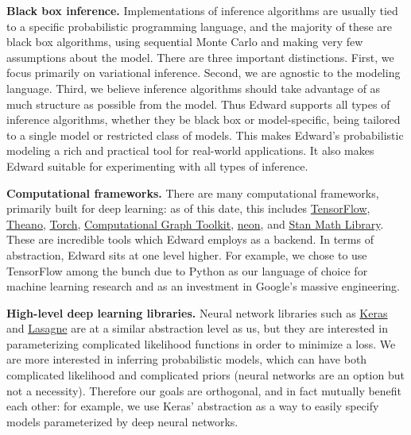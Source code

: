 \textbf{Black box inference.}
Implementations of inference algorithms are usually tied to a specific
probabilistic programming language, and the majority of these are
black box algorithms, using sequential Monte Carlo and making very few
assumptions about the model. There are three important distinctions.
First, we focus primarily on variational inference. Second, we are
agnostic to the modeling language. Third, we believe inference
algorithms should take advantage of as much structure as possible from
the model. Thus Edward supports all types of inference algorithms,
whether they be black box or model-specific, being tailored to a
single model or restricted class of models.  This makes Edward's
probabilistic modeling a rich and practical tool for real-world
applications. It also makes Edward suitable for experimenting with
all types of inference.

\textbf{Computational frameworks.}
There are many computational frameworks, primarily built for deep
learning: as of this date, this includes
\href{https://www.tensorflow.org}{TensorFlow},
\href{http://deeplearning.net/software/theano/}{Theano},
\href{http://torch.ch}{Torch},
\href{http://rll.berkeley.edu/cgt/}{Computational Graph Toolkit},
\href{https://github.com/NervanaSystems/neon}{neon}, and
\href{https://github.com/stan-dev/math}{Stan Math Library}. These are
incredible tools which Edward employs as a backend. In
terms of abstraction, Edward sits at one level higher. For example,
we chose to use TensorFlow among the bunch due to Python as our language
of choice for machine learning research and as an investment in Google's
massive engineering.

\textbf{High-level deep learning libraries.}
Neural network libraries
such as \href{https://github.com/fchollet/keras}{Keras} and
\href{https://github.com/Lasagne/Lasagne}{Lasagne} are at a similar
abstraction level as us, but they are interested in parameterizing
complicated likelihood functions in order to minimize a loss. We are
more interested in inferring probabilistic models, which can
have both complicated likelihood and complicated priors (neural networks
are an option but not a necessity). Therefore our goals are orthogonal,
and in fact mutually benefit each other: for example, we use Keras'
abstraction as a way to easily specify models parameterized by deep
neural networks.
